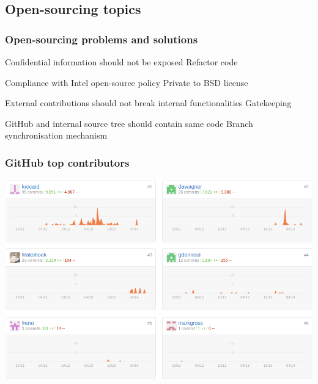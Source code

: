 \subsection{Open-sourcing topics}
\begin{frame}
    \frametitle{Open-sourcing problems and solutions}
    \begin{block}{Confidential information should not be exposed}
        Refactor code
    \end{block}
    \begin{block}{Compliance with Intel open-source policy}
        Private to BSD license
    \end{block}
    \begin{block}{External contributions should not break internal functionalities}
        Gatekeeping
    \end{block}
    \begin{block}{GitHub and internal source tree should contain same code}
        Branch synchronisation mechanism
    \end{block}
\end{frame}

\begin{frame}
    \frametitle{GitHub top contributors}
    \centering
    \includegraphics[width=\textwidth]{../../report/src/img/statsGitHub.png}
\end{frame}


